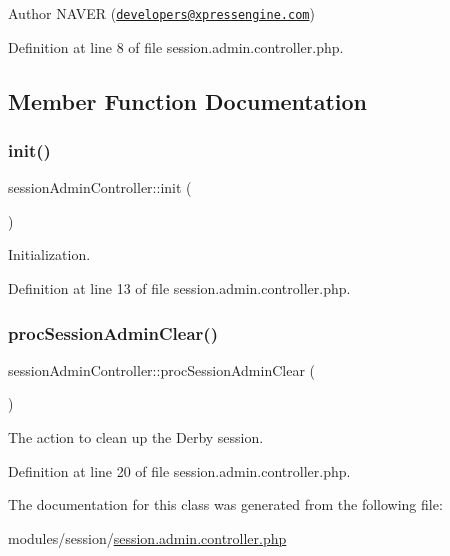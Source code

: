 \begin{DoxyAuthor}{Author}
N\+A\+V\+ER (\href{mailto:developers@xpressengine.com}{\tt developers@xpressengine.\+com}) 
\end{DoxyAuthor}


Definition at line 8 of file session.\+admin.\+controller.\+php.



\subsection{Member Function Documentation}
\mbox{\label{classsessionAdminController_a9865e37281a061bded58fa3f00478ee5}} 
\subsubsection{\texorpdfstring{init()}{init()}}
{\footnotesize\ttfamily session\+Admin\+Controller\+::init (\begin{DoxyParamCaption}{ }\end{DoxyParamCaption})}



Initialization. 



Definition at line 13 of file session.\+admin.\+controller.\+php.

\mbox{\label{classsessionAdminController_a502f604c9f27f92d5a6fb8e1c7409ca4}} 
\subsubsection{\texorpdfstring{proc\+Session\+Admin\+Clear()}{procSessionAdminClear()}}
{\footnotesize\ttfamily session\+Admin\+Controller\+::proc\+Session\+Admin\+Clear (\begin{DoxyParamCaption}{ }\end{DoxyParamCaption})}



The action to clean up the Derby session. 



Definition at line 20 of file session.\+admin.\+controller.\+php.



The documentation for this class was generated from the following file\+:\begin{DoxyCompactItemize}
\item 
modules/session/\hyperlink{session_8admin_8controller_8php}{session.\+admin.\+controller.\+php}\end{DoxyCompactItemize}
